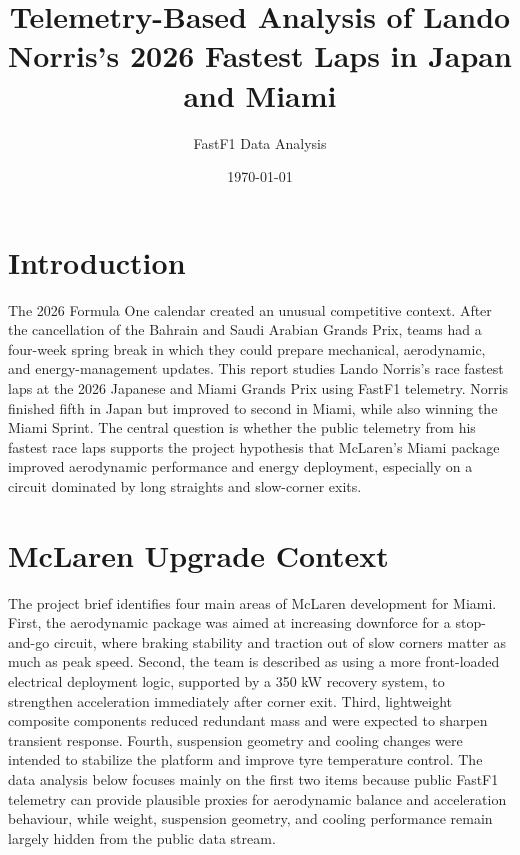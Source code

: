 \documentclass[11pt]{article}
\title{Telemetry-Based Analysis of Lando Norris's 2026 Fastest Laps in Japan and Miami}
\author{FastF1 Data Analysis}
\date{\today}
\begin{document}
\maketitle

\section{Introduction}
The 2026 Formula One calendar created an unusual competitive context. After the cancellation of the Bahrain and Saudi Arabian Grands Prix, teams had a four-week spring break in which they could prepare mechanical, aerodynamic, and energy-management updates. This report studies Lando Norris's race fastest laps at the 2026 Japanese and Miami Grands Prix using FastF1 telemetry. Norris finished fifth in Japan but improved to second in Miami, while also winning the Miami Sprint. The central question is whether the public telemetry from his fastest race laps supports the project hypothesis that McLaren's Miami package improved aerodynamic performance and energy deployment, especially on a circuit dominated by long straights and slow-corner exits.

\section{McLaren Upgrade Context}
The project brief identifies four main areas of McLaren development for Miami. First, the aerodynamic package was aimed at increasing downforce for a stop-and-go circuit, where braking stability and traction out of slow corners matter as much as peak speed. Second, the team is described as using a more front-loaded electrical deployment logic, supported by a 350 kW recovery system, to strengthen acceleration immediately after corner exit. Third, lightweight composite components reduced redundant mass and were expected to sharpen transient response. Fourth, suspension geometry and cooling changes were intended to stabilize the platform and improve tyre temperature control. The data analysis below focuses mainly on the first two items because public FastF1 telemetry can provide plausible proxies for aerodynamic balance and acceleration behaviour, while weight, suspension geometry, and cooling performance remain largely hidden from the public data stream.
\end{document}
